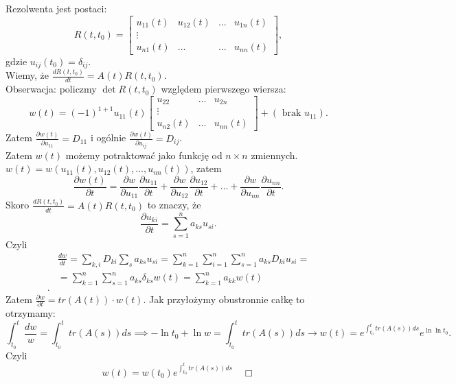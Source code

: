 \documentclass[../main.tex]{subfiles}
\begin{document}
        \begin{dowod}
            Rezolwenta jest postaci:
            \[
                R(t,t_0) = \begin{bmatrix} u_{11}(t) & u_{12}(t) & \ldots & u_{1n}(t)\\ \vdots \\ u_{n1}(t) & \ldots & \ldots & u_{nn}(t)\end{bmatrix}
            ,\]
            gdzie $u_{ij}(t_0) = \delta_{ij}$.\\
            Wiemy, że $\frac{d R(t,t_0)}{dt} = A(t) R(t,t_0)$.\\
            Obserwacja: policzmy $\det R(t,t_0)$ względem pierwszego wiersza:
            \[
                w(t) = (-1)^{1+1}u_{11}(t) \begin{bmatrix} u_{22} & \ldots & u_{2n} \\ \vdots \\ u_{n2}(t) & \ldots & u_{nn}(t) \end{bmatrix} + (\text{ brak  }u_{11})
            .\]
            Zatem $\frac{\partial w(t)}{\partial u_{11}} = D_{11}$ i ogólnie $\frac{\partial w(t)}{\partial u_{ij}} = D_{ij}$.\\
            Zatem $w(t)$ możemy potraktować jako funkcję od $n\times n$ zmiennych. $w(t) = w(u_{11}(t), u_{12}(t), \ldots, u_{nn}(t))$, zatem
            \[
                \frac{\partial w(t)}{\partial t} = \frac{\partial w}{\partial u_{11}} \frac{\partial u_{11}}{\partial t} + \frac{\partial w}{\partial u_{12}} \frac{\partial u_{12}}{\partial t} +\ldots+ \frac{\partial w}{\partial u_{nn}} \frac{\partial u_{nn}}{\partial t}
            .\]
            Skoro $\frac{d R(t,t_0)}{dt} = A(t) R(t,t_0)$ to znaczy, że
            \[
                \frac{\partial u_{ki}}{\partial t} = \sum_{s=1}^n a_{ks}u_{si}
            .\]
            Czyli
            \begin{align*}
                &\frac{d w}{dt} = \sum_{k,i}D_{ki} \sum_s a_{ks}u_{si} = \sum_{k=1}^n \sum_{i=1}^n \sum_{s=1}^n a_{ks} D_{ki}u_{si} =\\
                &= \sum_{k=1}^n\sum_{s=1}^n a_{ks}\delta_{ks}w(t) = \sum_{k=1}^n a_{kk}w(t)\\
            .\end{align*}
            Zatem $\frac{\partial w}{\partial t} = tr(A(t))\cdot  w(t)$. Jak przyłożymy obustronnie całkę to otrzymamy:
            \[
                \int_{t_0}^t \frac{dw}{w} = \int_{t_0}^t tr(A(s))ds \implies -\ln t_0 + \ln w = \int_{t_0}^t tr(A(s))ds \to w(t) = e^{\int_{t_0}^t tr(A(s))ds}e^{\ln \ln t_0}
            .\]
            Czyli
            \[
                w(t) = w(t_0) e^{\int_{t_0}^t tr(A(s))ds}\quad\Box
            \]
        \end{dowod}
\end{document}
